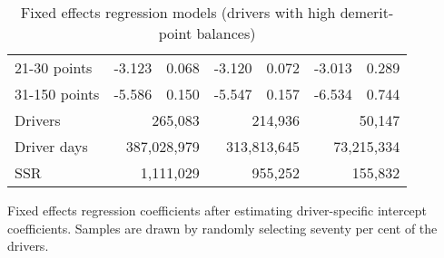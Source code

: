 \begin{table}
\begin{tabular}{l r r r r r r}
21-30 points  & -3.123  &  0.068  & -3.120  &  0.072  & -3.013  &  0.289   \\ 
 
31-150 points  & -5.586  &  0.150  & -5.547  &  0.157  & -6.534  &  0.744   \\ 
 

\hline 
 

Drivers 
 & \multicolumn{2}{r}{265,083}  & \multicolumn{2}{r}{214,936}  & \multicolumn{2}{r}{50,147}   \\ 
 

Driver days 
 & \multicolumn{2}{r}{387,028,979}  & \multicolumn{2}{r}{313,813,645}  & \multicolumn{2}{r}{73,215,334}   \\ 
 

SSR 
 & \multicolumn{2}{r}{1,111,029}  & \multicolumn{2}{r}{955,252}  & \multicolumn{2}{r}{155,832}   \\ 
 

\hline 
 
\end{tabular} 
\caption{Fixed effects regression models (drivers with high demerit-point balances)} 
Fixed effects regression coefficients after estimating driver-specific intercept coefficients. 
Samples are drawn by randomly selecting seventy per cent of the drivers. 
\label{tab:FE_regs_high_pts} 
\end{table} 
 
